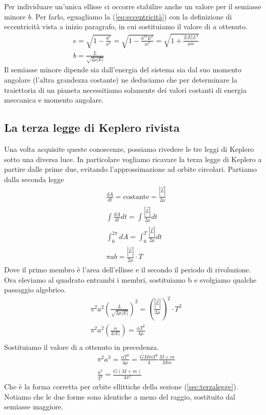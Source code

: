 \documentclass[10pt,a4paper]{article}
\begin{document}
Per individuare un'unica ellisse ci occorre stabilire anche un valore per il semiasse minore $b$.
Per farlo, eguagliamo la (\ref{eq:eccentricità}) con la definizione di eccentricità vista a inizio paragrafo, in cui sostituiamo il valore di $a$ ottenuto.
\begin{align*}
	&e = \sqrt{1-\frac{b^2}{a^2}} = \sqrt{1-\frac{b^24E^2}{\alpha^2}} = \sqrt{1+\frac{2|E|L^2}{\mu\alpha}}\\
	&b = \frac{L}{\sqrt{2\mu|E|}}
\end{align*}
Il semiasse minore dipende sia dall'energia del sistema sia dal suo momento angolare (l'altra grandezza costante) ne deduciamo che per determinare la traiettoria di un pianeta necessitiamo solamente dei valori costanti di energia meccanica e momento angolare. 
\subsection{La terza legge di Keplero rivista}\label{sec:terzaleggerivista}
Una volta acquisite queste conoscenze, possiamo rivedere le tre leggi di Keplero sotto una diversa luce. In particolare vogliamo ricavare la terza legge di Keplero a partire dalle prime due, evitando l'approssimazione ad orbite circolari. Partiamo dalla seconda legge
\begin{align*}
	&\frac{dA}{dt} = \text{costante} = \frac{|\vec{L}|}{2\mu}\\
	&\int\frac{dA}{dt}dt = \int\frac{|\vec{L}|}{2\mu}dt\\
	&\int_0^{2\pi} dA = \int_0^T\frac{|\vec{L}|}{2\mu}dt\\
	&\pi a b = \frac{|\vec{L}|}{2\mu} \cdot T
\end{align*}
Dove il primo membro è l'area dell'ellisse e il secondo il periodo di rivoluzione.\\
Ora eleviamo al quadrato entrambi i membri, sostituiamo b e svolgiamo qualche passaggio algebrico.
\begin{align*}
	&\pi^2 a^2 (\frac{L}{\sqrt{2\mu |E|}})^2  = (\frac{|\vec{L}|}{2\mu})^2 \cdot T^2\\
	&\pi^2 a^2(\frac{\alpha}{2|E|})=\frac{\alpha T^2}{4 \mu}\\
\end{align*}
Sostituiamo il valore di a ottenuto in precedenza. 
\begin{align*}
	&\pi^2 a^3=\frac{\alpha T^2}{4\mu} = \frac{GMm T^2}{4}\frac{M+m}{Mm}\\
	&\frac{a^3}{T^2}=\frac{G(M+m)}{4\pi^2}
\end{align*}
Che è la forma corretta per orbite ellittiche della sezione (\ref{sec:terzalegge}). Notiamo che le due forme sono identiche a meno del raggio, sostituito dal semiasse maggiore.
\end{document}
